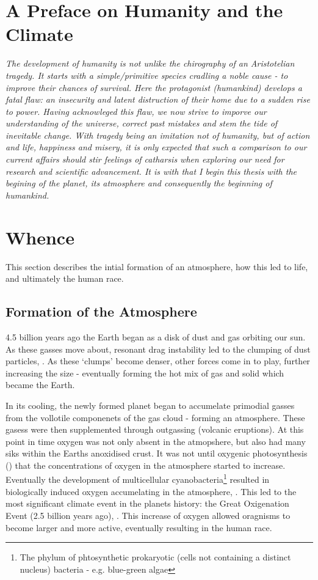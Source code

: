 
\section*{A Preface on Humanity and the Climate}
\begin{flushleft}\emph{
The development of humanity is not unlike the chirography of an Aristotelian tragedy. It starts with a simple/primitive species cradling a noble cause - to improve their chances of survival. Here the protagonist (humankind) develops a fatal flaw: an insecurity and latent distruction of their home due to a sudden rise to power.
Having acknowleged this flaw, we now strive to imporve our understanding of the universe, correct past mistakes and stem the tide of inevitable change. \vspace{\baselineskip}\linebreak
With tragedy being an imitation not of humanity, but of action and life, happiness and misery, it is only expected that such a comparison to our current affairs should stir feelings of catharsis when exploring our need for research and scientific advancement.
It is with that I begin this thesis with the begining of the planet, its atmosphere and consequently the beginning of humankind.
}
\end{flushleft}

\section{Whence}
This section describes the intial formation of an atmosphere, how this led to life, and ultimately the human race.
\subsection{Formation of the Atmosphere}
 4.5 billion years ago the Earth began as a disk of dust and gas orbiting our sun. As these gasses move about, resonant drag instability led to the clumping of dust particles, \cite{drag,planet}. As these `clumps' become denser, other forces come in to play, further increasing the size - eventually forming the hot mix of gas and solid which became the Earth.

In its cooling, the newly formed planet began to accumelate primodial gasses from the vollotile componenets of the gas cloud - forming an atmosphere. These gasess were then supplemented through outgassing (volcanic eruptions). At this point in time oxygen was not only absent in the atmopshere, but also had many siks within the Earths anoxidised crust. It was not until oxygenic photosynthesis (\cite{oxygenicphotosynthesis}) that the concentrations of oxygen in the atmosphere started to increase. Eventually the development of multicellular cyanobacteria\footnote{The phylum of phtosynthetic prokaryotic (cells not containing a distinct nucleus) bacteria - e.g. blue-green algae} resulted in biologically induced oxygen accumelating in the atmosphere, \cite{multicellular}. This led to the most significant climate event in the planets history: the Great Oxigenation Event (2.5 billion years ago), \cite{oxidation}. This increase of oxygen allowed oragnisms to become larger and more active, eventually resulting in the human race.


